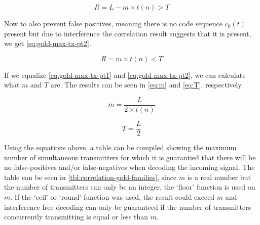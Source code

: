 \begin{equation}
	\label{eq:gold-max-tx-pt1}
	R = L - m \times t(n) > T
\end{equation}

Now to also prevent false positives, meaning there is no code sequence $c_0(t)$ present but due to interference the correlation result suggests that it is present, we get \autoref{eq:gold-max-tx-pt2}.


\begin{equation}
	\label{eq:gold-max-tx-pt2}
	R = m \times t(n) < T
\end{equation}

If we equalize \autoref{eq:gold-max-tx-pt1} and \autoref{eq:gold-max-tx-pt2}, we can calculate what $m$ and $T$ are.
The results can be seen in \autoref{eq:m} and \autoref{eq:T}, respectively.


\begin{equation}
	\label{eq:m}
	m = \frac{L}{2 \times t(n)}
\end{equation}

\begin{equation}
	\label{eq:T}
	T = \frac{L}{2}
\end{equation}


Using the equations above, a table can be compiled showing the maximum number of simultaneous transmitters for which it is guarantied that there will be no false-positives and/or false-negatives when decoding the incoming signal.
The table can be seen in \autoref{tbl:correlation-gold-families}, since $m$ is a real number but the number of transmitters can only be an integer, the `floor' function is used on $m$. If the `ceil' or `round' function was used, the result could exceed $m$ and interference free decoding can only be guaranteed if the number of transmitters concurrently transmitting is equal or less than $m$.



